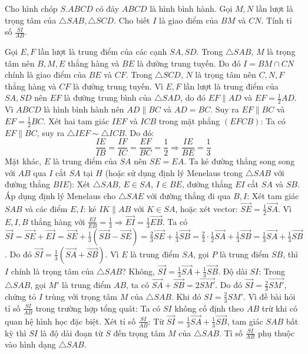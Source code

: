 \begin{baitap}
	Cho hình chóp $S.ABCD$ có đáy $ABCD$ là hình bình hành. Gọi $M, N$ lần lượt là trọng tâm của $\triangle SAB, \triangle SCD$. Cho biết $I$ là giao điểm của $BM$ và $CN$. Tính tỉ số $\frac{SI}{AB}$.
	\begin{traloi}
		Gọi $E, F$ lần lượt là trung điểm của các cạnh $SA, SD$.
		Trong $\triangle SAB$, $M$ là trọng tâm nên $B, M, E$ thẳng hàng và $BE$ là đường trung tuyến. Do đó $I = BM \cap CN$ chính là giao điểm của $BE$ và $CF$.
		Trong $\triangle SCD$, $N$ là trọng tâm nên $C, N, F$ thẳng hàng và $CF$ là đường trung tuyến.
		Vì $E, F$ lần lượt là trung điểm của $SA, SD$ nên $EF$ là đường trung bình của $\triangle SAD$, do đó $EF \parallel AD$ và $EF = \frac{1}{2}AD$.
		Vì $ABCD$ là hình bình hành nên $AD \parallel BC$ và $AD = BC$.
		Suy ra $EF \parallel BC$ và $EF = \frac{1}{2}BC$.
		Xét hai tam giác $IEF$ và $ICB$ trong mặt phẳng $(EFCB)$:
		Ta có $EF \parallel BC$, suy ra $\triangle IEF \sim \triangle ICB$.
		Do đó:
		\[
		\frac{IE}{IB} = \frac{IF}{IC} = \frac{EF}{BC} = \frac{1}{2} \Rightarrow \frac{IE}{BE} = \frac{1}{3}
		\]
		Mặt khác, $E$ là trung điểm của $SA$ nên $SE = EA$.
		Ta kẻ đường thẳng song song với $AB$ qua $I$ cắt $SA$ tại $H$ (hoặc sử dụng định lý Menelaus trong $\triangle SAB$ với đường thẳng $BIE$):
		Xét $\triangle SAB$, $E \in SA$, $I \in BE$, đường thẳng $EI$ cắt $SA$ và $SB$.
		Áp dụng định lý Menelaus cho $\triangle SAE$ với đường thẳng đi qua $B, I$:
		Xét tam giác $SAB$ và các điểm $E, I$: kẻ $IK \parallel AB$ với $K \in SA$, hoặc xét vector:
		$\vec{SE} = \frac{1}{2}\vec{SA}$. Vì $E, I, B$ thẳng hàng với $\frac{EI}{EB} = \frac{1}{3} \Rightarrow \vec{EI} = \frac{1}{3}\vec{EB}$.
		Ta có $\vec{SI} = \vec{SE} + \vec{EI} = \vec{SE} + \frac{1}{3}(\vec{SB} - \vec{SE}) = \frac{2}{3}\vec{SE} + \frac{1}{3}\vec{SB} = \frac{2}{3} \cdot \frac{1}{2}\vec{SA} + \frac{1}{3}\vec{SB} = \frac{1}{3}\vec{SA} + \frac{1}{3}\vec{SB}$.
		Do đó $\vec{SI} = \frac{1}{3}(\vec{SA} + \vec{SB})$.
		Vì $E$ là trung điểm $SA$, gọi $P$ là trung điểm $SB$, thì $I$ chính là trọng tâm của $\triangle SAB$?
		Không, $\vec{SI} = \frac{1}{3}\vec{SA} + \frac{1}{3}\vec{SB}$.
		Độ dài $SI$: Trong $\triangle SAB$, gọi $M'$ là trung điểm $AB$, ta có $\vec{SA} + \vec{SB} = 2\vec{SM'}$.
		Do đó $\vec{SI} = \frac{2}{3}\vec{SM'}$, chứng tỏ $I$ trùng với trọng tâm $M$ của $\triangle SAB$.
		Khi đó $SI = \frac{2}{3}SM'$.
		Vì đề bài hỏi tỉ số $\frac{SI}{AB}$ trong trường hợp tổng quát:
		Ta có $SI$ không cố định theo $AB$ trừ khi có quan hệ hình học đặc biệt. Xét tỉ số $\frac{SI}{AB}$:
		Từ $\vec{SI} = \frac{1}{3}\vec{SA} + \frac{1}{3}\vec{SB}$, tam giác $SAB$ bất kỳ thì $SI$ là độ dài đoạn từ $S$ đến trọng tâm $M$ của $\triangle SAB$.
		Tỉ số $\frac{SI}{AB}$ phụ thuộc vào hình dạng $\triangle SAB$.
	\end{traloi}
\end{baitap}

